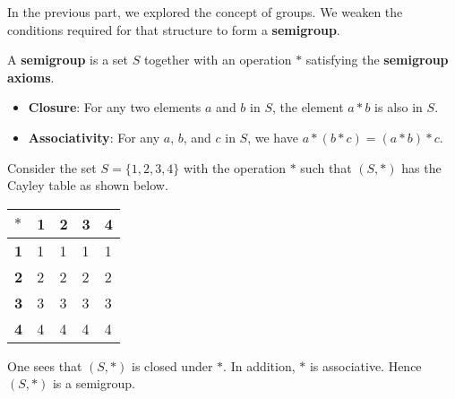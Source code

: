 In the previous part, we explored the concept of groups. We weaken the conditions required for that structure to form a \textbf{semigroup}.
\begin{definition}
    A \textbf{semigroup} is a set $S$ together with an operation $\ast$ satisfying the \textbf{semigroup axioms}.
    \begin{itemize}
        \item \textbf{Closure}: For any two elements $a$ and $b$ in $S$, the element $a\ast b$ is also in $S$.
        \item \textbf{Associativity}: For any $a$, $b$, and $c$ in $S$, we have $a \ast (b \ast c) = (a \ast b) \ast c$.
    \end{itemize}
\end{definition}
\begin{example}
    Consider the set $S = \{1, 2, 3, 4\}$ with the operation $\ast$ such that $(S, \ast)$ has the Cayley table as shown below.
    \begin{table}[h]
        \centering
        \begin{tabular}{|l|l|l|l|l|}
            \hline
            $\ast$     & \textbf{1} & \textbf{2} & \textbf{3} & \textbf{4} \\ \hline
            \textbf{1} & 1          & 1          & 1          & 1          \\ \hline
            \textbf{2} & 2          & 2          & 2          & 2          \\ \hline
            \textbf{3} & 3          & 3          & 3          & 3          \\ \hline
            \textbf{4} & 4          & 4          & 4          & 4          \\ \hline
        \end{tabular}
    \end{table}
    
    One sees that $(S, \ast)$ is closed under $\ast$. In addition, $\ast$ is associative. Hence $(S, \ast)$ is a semigroup.
\end{example}

